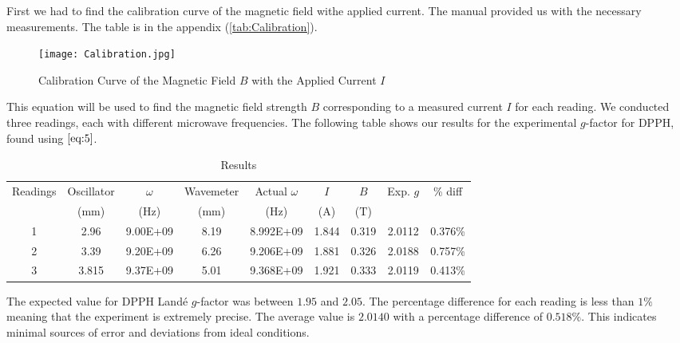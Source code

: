 \documentclass[11pt]{article}
\begin{document}
	First we had to find the calibration curve of the magnetic field withe applied current. The manual provided us with the necessary measurements. The table is in the appendix (\ref{tab:Calibration}).
	
	\begin{figure}[htbp]
		\centering
		\caption{Calibration Curve of the Magnetic Field $B$ with the Applied Current $I$}
		\texttt{[image: Calibration.jpg]}
	\end{figure}
	
	This equation will be used to find the magnetic field strength $B$ corresponding to a measured current $I$ for each reading. We conducted three readings, each with different microwave frequencies. The following table shows our results for the experimental $g$-factor for DPPH, found using $\ref{eq:5}$.
	
	\begin{table}[htbp]
		\centering
		\caption{Results}
		\begin{tabular}{ccccccccc}
			\toprule
			Readings & Oscillator & $\omega$ & Wavemeter & Actual $\omega$ & $I$ & $B$ & Exp. $g$ & \% diff \\
			~ & ($\unit{\milli\meter}$) & ($\unit{\hertz}$) & ($\unit{\milli\meter}$) & ($\unit{\hertz}$) & ($\unit{\ampere}$) & ($\unit{\tesla}$) & ~ & ~ \\
			\midrule
			1 & 2.96 & 9.00E+09 & 8.19 & 8.992E+09 & 1.844 & 0.319 & 2.0112 & 0.376\% \\
			2 & 3.39 & 9.20E+09 & 6.26 & 9.206E+09 & 1.881 & 0.326 & 2.0188 & 0.757\% \\
			3 & 3.815 & 9.37E+09 & 5.01 & 9.368E+09 & 1.921 & 0.333 & 2.0119 & 0.413\% \\
			\bottomrule
		\end{tabular}%
		\label{tab:Results}%
	\end{table}%
	
	The expected value for DPPH Landé $g$-factor was between $1.95$ and $2.05$. The percentage difference for each reading is less than $1\%$ meaning that the experiment is extremely precise. The average value is $2.0140$ with a percentage difference of $0.518\%$. This indicates minimal sources of error and deviations from ideal conditions.
	
\clearpage
	
\end{document}
